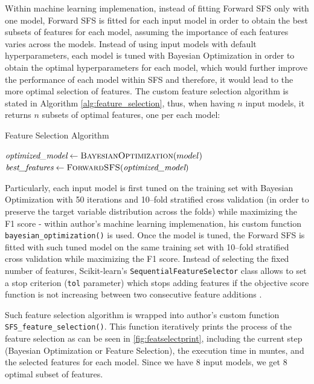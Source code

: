 Within machine learning implemenation, instead of fitting Forward SFS only with one model, Forward SFS is fitted for each input model in order to obtain the best subsets of features for each model, assuming the importance of each features varies across the models.
Instead of using input models with default hyperparameters, each model is tuned with Bayesian Optimization in order to obtain the optimal hyperparameters for each model, which would further improve the performance of each model within SFS and therefore, it would lead to the more optimal selection of features.
The custom feature selection algorithm is stated in Algorithm \autoref{alg:feature_selection}, thus, when having $n$ input models, it returns $n$  subsets of optimal features, one per each model:
\begin{algorithm}[H]
\caption{Feature Selection Algorithm}
\label{alg:feature_selection}
\begin{algorithmic}[1]
    \State $\textit{optimized\_model} \gets \textsc{BayesianOptimization}(model)$
    \State $\textit{best\_features} \gets \textsc{ForwardSFS}(\textit{optimized\_model})$
\EndFor
\end{algorithmic}
\end{algorithm}
Particularly, each input model is first tuned on the training set with Bayesian Optimization with 50 iterations and 10--fold stratified cross validation (in order to preserve the target variable distribution across the folds) while maximizing the F1 score - within author's machine learning implemenation, his custom function \lstinline{bayesian_optimization()} is used.
Once the model is tuned, the Forward SFS is fitted with such tuned model on the same training set with 10--fold stratified cross validation while maximizing the F1 score. Instead of selecting the fixed number of features, Scikit-learn's \lstinline{SequentialFeatureSelector}  class allows to set a stop criterion (\lstinline{tol} parameter) which stops adding features if the objective score function is not increasing between two consecutive feature additions \citep{sfs}.


Such feature selection algorithm is wrapped into author's custom function \lstinline{SFS_feature_selection()}.
This function iteratively prints the process of the feature selection as can be seen in \autoref{fig:featselectprint}, including the current step (Bayesian Optimization or Feature Selection), the execution time in muntes, and the selected features for each model. Since we have 8 input models, we get 8 optimal subset of features.


